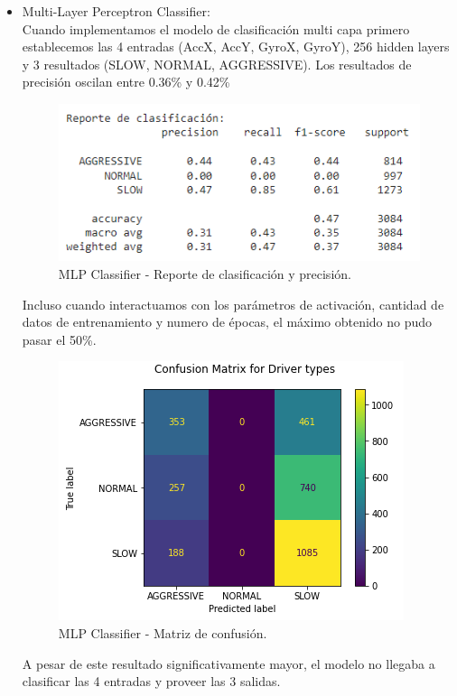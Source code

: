 \documentclass[runningheads]{llncs}
\begin{document}
\begin{itemize}
    \newpage
    
    \item Multi-Layer Perceptron Classifier:\\
    Cuando implementamos el modelo de clasificación multi capa primero establecemos las 4 entradas (AccX, AccY, GyroX, GyroY), 256 hidden layers y 3 resultados (SLOW, NORMAL, AGGRESSIVE). Los resultados de precisión oscilan entre 0.36\% y 0.42\%\\
    
    \begin{figure}
        \centering
        \includegraphics[width=0.8\columnwidth]{restest.png}
        \caption{MLP Classifier - Reporte de clasificación y precisión.}
        \label{fig:comand}%
    \end{figure}
    
    Incluso cuando interactuamos con los parámetros de activación, cantidad de datos de entrenamiento y numero de épocas, el máximo obtenido no pudo pasar el 50\%.\\
    
    \begin{figure}
        \centering
        \includegraphics[width=0.5\columnwidth]{confucion.png}
        \caption{MLP Classifier - Matriz de confusión.}
        \label{fig:comand}%
    \end{figure}
    
    A pesar de este resultado significativamente mayor, el modelo no llegaba a clasificar las 4 entradas y proveer las 3 salidas.  
\end{itemize}
\end{document}
